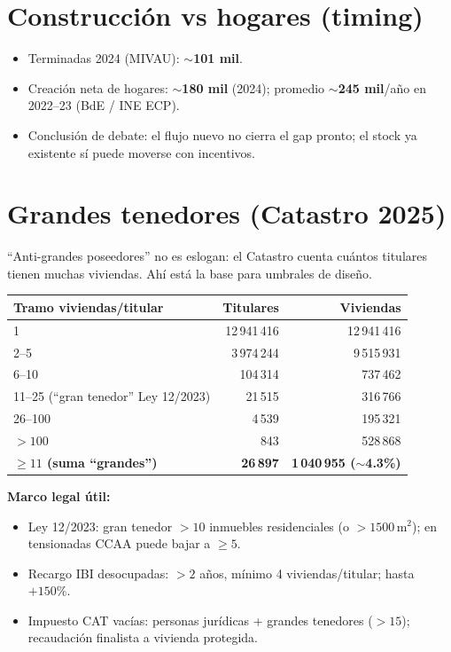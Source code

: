 \documentclass[11pt,a4paper]{report}
\begin{document}
\section{Construcci\'on vs hogares (timing)}

\begin{dato}
\begin{itemize}
  \item Terminadas 2024 (MIVAU): $\sim$\textbf{101 mil}.
  \item Creaci\'on neta de hogares: $\sim$\textbf{180 mil} (2024); promedio
        $\sim$\textbf{245 mil}/año en 2022--23 (BdE / INE ECP).
  \item Conclusi\'on de debate: el flujo nuevo no cierra el gap pronto;
        el stock ya existente s\'i puede moverse con incentivos.
\end{itemize}
\end{dato}

\section{Grandes tenedores (Catastro 2025)}

\begin{intuicion}
``Anti-grandes poseedores'' no es eslogan: el Catastro cuenta cu\'antos titulares
tienen muchas viviendas. Ah\'i est\'a la base para umbrales de dise\~no.
\end{intuicion}

\begin{center}
\renewcommand{\arraystretch}{1.15}
\begin{tabular}{@{}lrr@{}}
\toprule
\textbf{Tramo viviendas/titular} & \textbf{Titulares} & \textbf{Viviendas} \\
\midrule
1 & 12\,941\,416 & 12\,941\,416 \\
2--5 & 3\,974\,244 & 9\,515\,931 \\
6--10 & 104\,314 & 737\,462 \\
11--25 (``gran tenedor'' Ley 12/2023) & 21\,515 & 316\,766 \\
26--100 & 4\,539 & 195\,321 \\
$>100$ & 843 & 528\,868 \\
\midrule
\textbf{$\ge 11$ (suma ``grandes'')} & \textbf{26\,897} & \textbf{1\,040\,955 ($\sim$4.3\%)} \\
\bottomrule
\end{tabular}
\end{center}

\textbf{Marco legal \'util:}
\begin{itemize}
  \item Ley 12/2023: gran tenedor $>10$ inmuebles residenciales (o $>1500\,\mathrm{m}^{2}$);
        en tensionadas CCAA puede bajar a $\ge 5$.
  \item Recargo IBI desocupadas: $>2$ a\~nos, m\'inimo 4 viviendas/titular; hasta $+150\%$.
  \item Impuesto CAT vac\'ias: personas jur\'idicas + grandes tenedores ($>15$);
        recaudaci\'on finalista a vivienda protegida.
\end{itemize}
\end{document}
